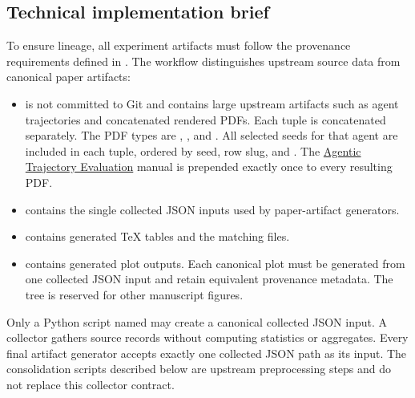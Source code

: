 \documentclass[11pt]{article}
\begin{document}
\subsection*{Technical implementation brief}
To ensure lineage, all experiment artifacts must follow the provenance requirements defined in \href{../../docs-template/tex/source/results_guideline.tex}{}.
The workflow distinguishes upstream source data from canonical paper artifacts:
\begin{itemize}
  \item {} is not committed to Git and contains large upstream artifacts such as agent trajectories and concatenated rendered PDFs.
  Each  tuple is concatenated separately.
  The PDF types are , , and .
  All selected seeds for that agent are included in each tuple, ordered by seed, row slug, and \termRunID.
  The \hyperref[docstart:agentic_trajectory_evaluation]{Agentic Trajectory Evaluation} manual is prepended exactly once to every resulting PDF.
  \item {} contains the single collected JSON inputs used by paper-artifact generators.
  \item {} contains generated TeX tables and the matching  files.
  \item {} contains generated plot outputs. Each canonical plot must be generated from one collected JSON input and retain equivalent provenance metadata. The  tree is reserved for other manuscript figures.
\end{itemize}
Only a Python script named  may create a canonical collected JSON input.
A collector gathers source records without computing statistics or aggregates. Every final artifact generator accepts exactly one collected JSON path as its input. The consolidation scripts described below are upstream preprocessing steps and do not replace this collector contract.

\label{sec:experiment-plan-commands-to-run}
\end{document}
